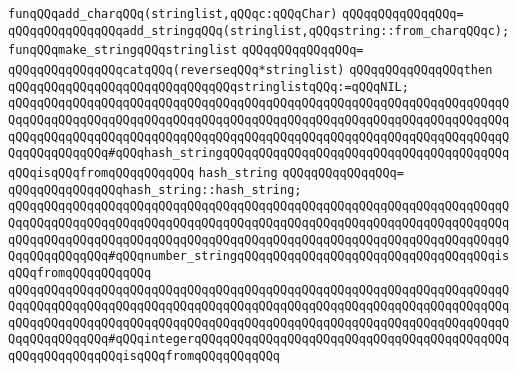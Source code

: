 \newline
\newline
\verb|funqQQqadd_charqQQq(stringlist,qQQqc:qQQqChar)|\newline
\verb|qQQqqQQqqQQqqQQq=|\newline
\verb|qQQqqQQqqQQqqQQqadd_stringqQQq(stringlist,qQQqstring::from_charqQQqc);|\newline
\newline
\newline
\verb|funqQQqmake_stringqQQqstringlist|\newline
\verb|qQQqqQQqqQQqqQQq=|\newline
\verb|qQQqqQQqqQQqqQQqcatqQQq(reverseqQQq*stringlist)|\newline
\verb|qQQqqQQqqQQqqQQqthen|\newline
\verb|qQQqqQQqqQQqqQQqqQQqqQQqqQQqqQQqstringlistqQQq:=qQQqNIL;|\newline
\newline
\verb|qQQqqQQqqQQqqQQqqQQqqQQqqQQqqQQqqQQqqQQqqQQqqQQqqQQqqQQqqQQqqQQqqQQqqQQqqQQqqQQqqQQqqQQqqQQqqQQqqQQqqQQqqQQqqQQqqQQqqQQqqQQqqQQqqQQqqQQqqQQqqQQqqQQqqQQqqQQqqQQqqQQqqQQqqQQqqQQqqQQqqQQqqQQqqQQqqQQqqQQqqQQqqQQqqQQqqQQqqQQqqQQq#qQQqhash_stringqQQqqQQqqQQqqQQqqQQqqQQqqQQqqQQqqQQqqQQqqQQqisqQQqfromqQQqqQQqqQQq|\newline
\verb|hash_string|\newline
\verb|qQQqqQQqqQQqqQQq=|\newline
\verb|qQQqqQQqqQQqqQQqhash_string::hash_string;|\newline
\newline
\verb|qQQqqQQqqQQqqQQqqQQqqQQqqQQqqQQqqQQqqQQqqQQqqQQqqQQqqQQqqQQqqQQqqQQqqQQqqQQqqQQqqQQqqQQqqQQqqQQqqQQqqQQqqQQqqQQqqQQqqQQqqQQqqQQqqQQqqQQqqQQqqQQqqQQqqQQqqQQqqQQqqQQqqQQqqQQqqQQqqQQqqQQqqQQqqQQqqQQqqQQqqQQqqQQqqQQqqQQqqQQqqQQq#qQQqnumber_stringqQQqqQQqqQQqqQQqqQQqqQQqqQQqqQQqqQQqisqQQqfromqQQqqQQqqQQq|\newline
\verb|qQQqqQQqqQQqqQQqqQQqqQQqqQQqqQQqqQQqqQQqqQQqqQQqqQQqqQQqqQQqqQQqqQQqqQQqqQQqqQQqqQQqqQQqqQQqqQQqqQQqqQQqqQQqqQQqqQQqqQQqqQQqqQQqqQQqqQQqqQQqqQQqqQQqqQQqqQQqqQQqqQQqqQQqqQQqqQQqqQQqqQQqqQQqqQQqqQQqqQQqqQQqqQQqqQQqqQQqqQQqqQQq#qQQqintegerqQQqqQQqqQQqqQQqqQQqqQQqqQQqqQQqqQQqqQQqqQQqqQQqqQQqqQQqqQQqisqQQqfromqQQqqQQqqQQq|\newline
